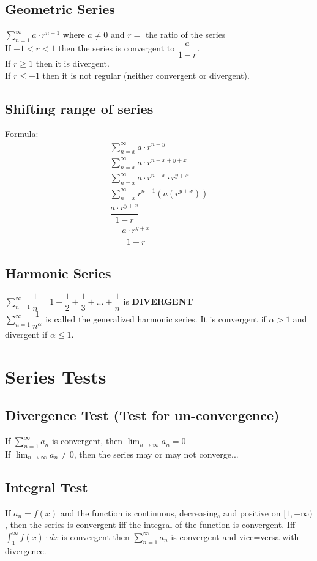 \documentclass{article}
\begin{document}
\subsection*{Geometric Series}
$\displaystyle \sum^\infty_{n=1}a \cdot r^{n-1}$ where $a\not= 0$ and $r=$ the ratio of the series\\
If $-1<r<1$ then the series is convergent to $\dfrac{a}{1-r}$.\\
If $r\ge 1$ then it is divergent.\\
If $r\le -1$ then it is not regular (neither convergent or divergent).
\subsection*{Shifting range of series}
Formula:
\begin{equation}
\begin{aligned}
\sum^\infty_{n=x}a \cdot r^{n+y}\\
\sum^\infty_{n=x}a \cdot r^{n-x+y+x}\\
\sum^\infty_{n=x}a \cdot r^{n-x} \cdot r^{y+x}\\
\sum^\infty_{n=x}r^{n-1}(a(r^{y+x}))\\
\dfrac{a \cdot r^{y+x} }{1-r}\\
=\dfrac{a \cdot r^{y+x} }{1-r}
\end{aligned}
\end{equation}
\subsection*{Harmonic Series}
$\displaystyle \sum^\infty_{n=1}\dfrac{1}{n}=1+\dfrac{1}{2}+\dfrac{1}{3}+...+\dfrac{1}{n}$  is \textbf{DIVERGENT}\\
$\displaystyle \sum^\infty_{n=1}\dfrac{1}{n^\alpha}$ is called the generalized harmonic series. It is convergent if $\alpha >1$ and divergent if $\alpha\le 1$.
\section{Series Tests}
\subsection*{Divergence Test (Test for un-convergence)}
If $\displaystyle \sum^\infty_{n=1}a_n$ is convergent, then $\displaystyle \lim_{n\to\infty}a_n=0$\\
If $\displaystyle \lim_{n\to\infty}a_n\not= 0$, then the series may or may not converge...
\subsection*{Integral Test}
If $a_n=f(x)$ and the function is continuous, decreasing, and positive on $[1,+\infty)$, then the series is convergent iff the integral of the function is convergent. Iff $\int^\infty_1 f(x) \cdot dx$ is convergent then $\displaystyle \sum^\infty_{n=1}a_n$ is convergent and vice=versa with divergence.
\end{document}
